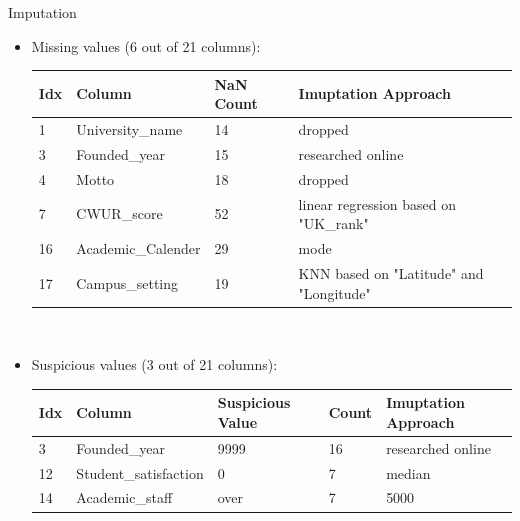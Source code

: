 \documentclass[xcolor=table]{beamer} %
\begin{document}
\begin{frame}{Imputation}
  \vspace{-1cm}
  \begin{itemize}
  \item Missing values (6 out of 21 columns):
    \begin{table}[h]
      \centering
      \tiny
      \begin{tabular}{l|l|l|l}
        Idx & Column             & NaN Count & Imuptation Approach \\
        \hline
        1   & University\_name   & 14        & dropped \\
        3   & Founded\_year      & 15        & researched online \\
        4   & Motto              & 18        & dropped \\
        7   & CWUR\_score        & 52        & linear regression based on "UK\_rank" \\
        16  & Academic\_Calender & 29        & mode \\
        17  & Campus\_setting    & 19        & KNN based on "Latitude" and "Longitude"
      \end{tabular}\hfill\
      \label{tab:missing_values_nan}
    \end{table}
  \item Suspicious values (3 out of 21 columns):
    \begin{table}[h]
      \centering
      \tiny
      \begin{tabular}{l|l|l|l|l}
        Idx & Column                & Suspicious Value & Count & Imuptation Approach \\
        \hline
        3   & Founded\_year         & 9999             & 16    & researched online \\
        12  & Student\_satisfaction & 0                & 7     & median \\
        14  & Academic\_staff       & over             & 7     & 5000 \\
      \end{tabular}\hfill\
      \label{tab:missing_values_zero}
    \end{table}
  \end{itemize}
\end{frame}
\end{document}
